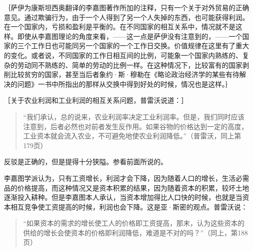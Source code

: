 
｛萨伊为康斯坦西奥翻译的李嘉图著作所加的注释，只有一个关于对外贸易的正确意见。通过欺骗行为，由于一个人得到了另一个人失掉的东西，也可能获得利润。在一个国家内，亏损和盈利是平衡的。在不同国家的相互关系中，情况就不是这样。即使从李嘉图理论的角度来看，——这一点是萨伊没有注意到的，——一个国家的三个工作日也可能同另一个国家的一个工作日交换。价值规律在这里有了重大的变化。或者说，不同国家的工作日相互间的比例，可能象一个国家内熟练的、复杂的劳动同不熟练的、简单的劳动的比例一样。在这种情况下，比较富有的国家剥削比较贫穷的国家，甚至当后者象约·斯·穆勒在《略论政治经济学的某些有待解决的问题》一书中所指出的那样从交换中得到好处的时候，情况也是这样。｝


［关于农业利润和工业利润的相互关系问题，普雷沃说道：］

\begin{quote}{“我们承认，总的说来，农业利润率决定工业利润率。但是，我们同时应该注意到，后者必然也对前者发生反作用。如果谷物的价格达到一定的高度，工业资本就会流入农业，不可避免地使农业利润降低。”（普雷沃，同上第179页）}\end{quote}

反驳是正确的，但是提得十分狭隘。参看前面所说的。

李嘉图学派认为，只有工资增长，利润才会下降，因为随着人口的增长，生活必需品的价格提高，而这种情况又是资本积累的结果，因为随着资本的积累，较坏土地逐渐投入耕种。但是李嘉图本人承认，当资本增加得比人口快的时候，也就是当资本相互竞争使工资提高的时候，利润也会下降。这是亚·斯密的观点。普雷沃说：

\begin{quote}{“如果资本的需求的增长使工人的价格即工资提高，那末，认为这些资本的供给的增长会使资本的价格即利润降低，难道是不对的吗？”（同上，第188页）}\end{quote}

